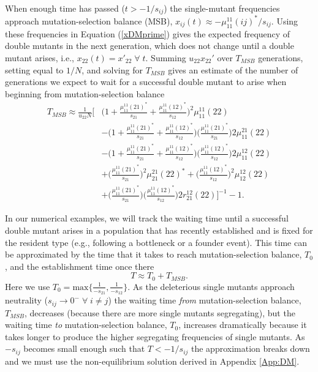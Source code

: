 \documentclass[review,3p,authoryear]{elsarticle}
\begin{document}
When enough time has passed ($t > -1/s_{ij}$) the single-mutant frequencies approach mutation-selection balance (MSB), $x_{ij}(t) \approx -\mu_{11}^{11}(ij)^*/s_{ij}$. 
Using these frequencies in Equation (\ref{xDMprime}) gives the expected frequency of double mutants in the next generation, which does not change until a double mutant arises, i.e., $x_{22}(t) = x'_{22} \; \forall \;t$.
Summing $u_{22} x_{22}'$ over $T_{MSB}$ generations, setting equal to $1/N$, and solving for $T_{MSB}$ gives an estimate of the number of generations we expect to wait for a successful double mutant to arise when beginning from mutation-selection balance 
\begin{align}\label{CTMSB}
T_{MSB} \approx \frac{1}{u_{22} N} \Big[ 
&  \Big(1 + \frac{\mu_{11}^{11}(21)^*}{s_{21}} + \frac{\mu_{11}^{11}(12)^*}{s_{12}} \Big)^2 \mu_{11}^{11}(22) \nonumber\\
& - \Big( 1 + \frac{\mu_{11}^{11}(21)^*}{s_{21}} + \frac{\mu_{11}^{11}(12)^*}{s_{12}} \Big) \Big( \frac{\mu_{11}^{11}(21)^*}{s_{21}} \Big) 2 \mu_{11}^{21}(22) \nonumber\\
& - \Big( 1 + \frac{\mu_{11}^{11}(21)^*}{s_{21}} + \frac{\mu_{11}^{11}(12)^*}{s_{12}} \Big) \Big( \frac{\mu_{11}^{11}(12)^*}{s_{12}} \Big) 2 \mu_{11}^{12}(22) \nonumber\\
& + \Big(\frac{\mu_{11}^{11}(21)^*}{s_{21}}\Big)^2 \mu_{21}^{21}(22)^* + \Big(\frac{\mu_{11}^{11}(12)^*}{s_{12}}\Big)^2 \mu_{12}^{12}(22) \nonumber\\
& + \Big( \frac{\mu_{11}^{11}(21)^*}{s_{21}} \Big) \Big( \frac{\mu_{11}^{11}(12)^*}{s_{12}} \Big) 2 r_{21}^{12}(22) 
\Big]^{-1}  - 1. 
\end{align}

In our numerical examples, we will track the waiting time until a successful double mutant arises in a population that has recently established and is fixed for the resident type (e.g., following a bottleneck or a founder event).  
This time can be approximated by the time that it takes to reach mutation-selection balance, $T_0$, and the establishment time once there
\begin{equation}\label{MSB}
T\approx T_0+T_{MSB}.
\end{equation}
Here we use $T_0 = \mathrm{max} \{\frac{1}{-s_{21}},\frac{1}{-s_{12}}\}$. 
As the deleterious single mutants approach neutrality ($s_{ij}\rightarrow0^- \;\forall \; i\neq j$) the waiting time \textit{from} mutation-selection balance, $T_{MSB}$, decreases (because there are more single mutants segregating), but the waiting time \textit{to} mutation-selection balance, $T_0$, increases dramatically because it takes longer to produce the higher segregating frequencies of single mutants. 
As $-s_{ij}$ becomes small enough such that $T<-1/s_{ij}$ the approximation breaks down and we must use the non-equilibrium solution derived in Appendix \ref{App:DM}.
\end{document}
